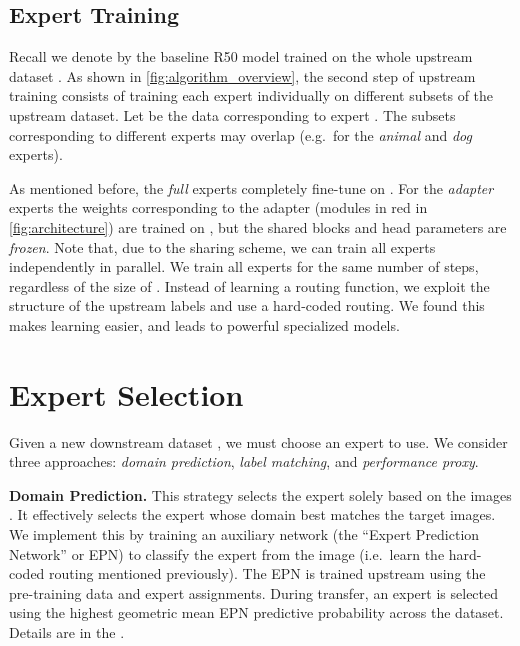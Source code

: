 \documentclass{article}
\begin{document}
\subsection{Expert Training}
\label{subsec:expert_training}
Recall we denote by  the baseline R50 model trained on the whole upstream dataset .
As shown in \cref{fig:algorithm_overview}, the second step of upstream training consists of training each expert individually on 
different subsets of the upstream dataset.
Let  be the data corresponding to expert .
The subsets corresponding to different experts may overlap (e.g.\ for the \emph{animal} and \emph{dog} experts).

As mentioned before, the \emph{full} experts completely fine-tune  on .
For the \emph{adapter} experts the weights corresponding to the 
adapter  (modules in red in \cref{fig:architecture}) are trained on , but the shared blocks and head parameters are 
\emph{frozen}.
Note that, due to the sharing scheme, we can train all experts independently in parallel.
We train all experts for the same number of steps, regardless of the size of .
Instead of learning a routing function, we exploit the structure of the upstream labels and
use a hard-coded routing. 
We found this makes learning easier, and leads to powerful specialized models.









 \section{Expert Selection}
\label{sec:transfer}


Given a new downstream dataset , we must choose an expert to use.
We consider three approaches: \emph{domain prediction}, \emph{label matching}, and \emph{performance proxy}.

\textbf{Domain Prediction.}
This strategy selects the expert solely based on the images . It effectively selects the expert whose domain best matches the target images.
We implement this by training an auxiliary network (the ``Expert Prediction Network'' or EPN) to classify the expert from the image (i.e.\ learn the hard-coded routing mentioned previously).
The EPN is trained upstream using the pre-training data and expert assignments.
During transfer, an expert is selected using the highest geometric mean EPN predictive probability across the dataset.
Details are in the .
\end{document}
